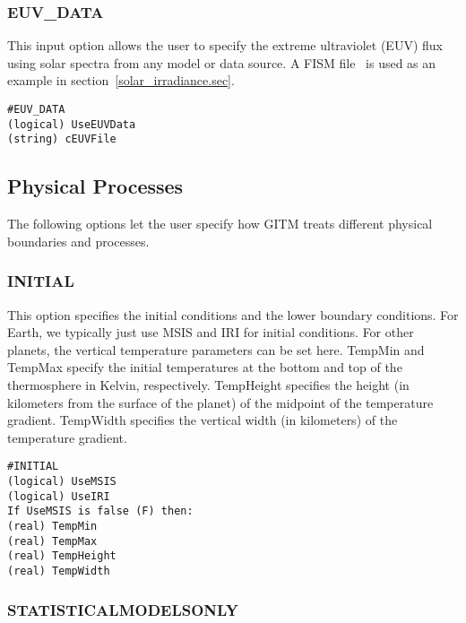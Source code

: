 \subsubsection{EUV\_DATA}
\label{euv.sec}

This input option allows the user to specify the extreme ultraviolet (EUV) flux using solar spectra from any model or data source.  A FISM file~\citep{fism:2007d, fism:2008f} is used as an example in section~\ref{solar_irradiance.sec}.

\begin{verbatim}
#EUV_DATA
(logical) UseEUVData   
(string) cEUVFile     
\end{verbatim}


\subsection{Physical Processes}
\label{physics.sec}

The following options let the user specify how GITM treats different physical boundaries and processes.

\subsubsection{INITIAL}
\label{initial.sec}

This option specifies the initial conditions and the lower boundary conditions.  For Earth, we typically just use MSIS and IRI for initial conditions.  For other planets, the vertical temperature parameters can be set here.  TempMin and TempMax specify the initial temperatures at the bottom and top of the thermosphere in Kelvin, respectively.  TempHeight specifies the height (in kilometers from the surface of the planet) of the midpoint of the temperature gradient.  TempWidth specifies the vertical width (in kilometers) of the temperature gradient. 

\begin{verbatim}
#INITIAL
(logical) UseMSIS
(logical) UseIRI 
If UseMSIS is false (F) then:
(real) TempMin      
(real) TempMax        
(real) TempHeight     
(real) TempWidth     
\end{verbatim}

\subsubsection{STATISTICALMODELSONLY}
\label{statisticalmodelsonly.sec}

